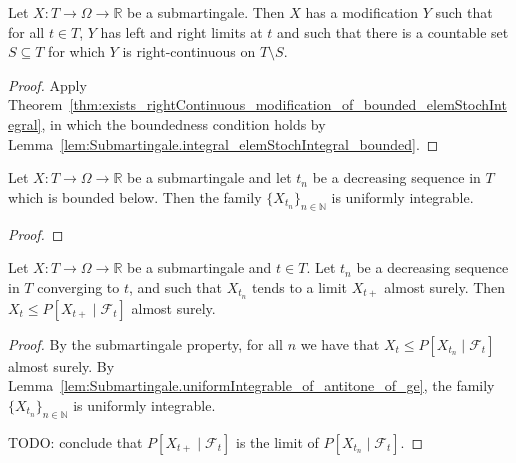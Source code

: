 \begin{lemma}\label{lem:Submartingale.exists_modifications_limits}
Let $X : T \to \Omega \to \mathbb{R}$ be a submartingale.
Then $X$ has a modification $Y$ such that for all $t \in T$, $Y$ has left and right limits at $t$ and such that there is a countable set $S \subseteq T$ for which $Y$ is right-continuous on $T \setminus S$.
\end{lemma}

\begin{proof}
Apply Theorem~\ref{thm:exists_rightContinuous_modification_of_bounded_elemStochIntegral}, in which the boundedness condition holds by Lemma~\ref{lem:Submartingale.integral_elemStochIntegral_bounded}.
\end{proof}


\begin{lemma}\label{lem:Submartingale.uniformIntegrable_of_antitone_of_ge}
Let $X : T \to \Omega \to \mathbb{R}$ be a submartingale and let $t_n$ be a decreasing sequence in $T$ which is bounded below.
Then the family $\{X_{t_n}\}_{n \in \mathbb{N}}$ is uniformly integrable.
\end{lemma}

\begin{proof}

\end{proof}


\begin{lemma}\label{lem:Submartingale.le_condExp_of_tendsto}
Let $X : T \to \Omega \to \mathbb{R}$ be a submartingale and $t \in T$.
Let $t_n$ be a decreasing sequence in $T$ converging to $t$, and such that $X_{t_n}$ tends to a limit $X_{t+}$ almost surely.
Then $X_t \le P[X_{t+} \mid \mathcal{F}_t]$ almost surely.
\end{lemma}

\begin{proof}
By the submartingale property, for all $n$ we have that $X_t \le P[X_{t_n} \mid \mathcal{F}_t]$ almost surely.
By Lemma~\ref{lem:Submartingale.uniformIntegrable_of_antitone_of_ge}, the family $\{X_{t_n}\}_{n \in \mathbb{N}}$ is uniformly integrable.


TODO: conclude that $P[X_{t+} \mid \mathcal{F}_t]$ is the limit of $P[X_{t_n} \mid \mathcal{F}_t]$.

\end{proof}


